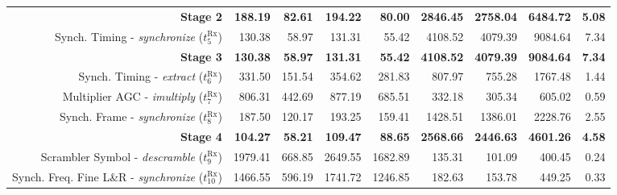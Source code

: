 \begin{table}[htp]
{{\begin{tabular}{r r r r r r r r r}
                                                                         \textbf{Stage 2} &  \textbf{188.19} &  \textbf{82.61} &  \textbf{194.22} &           \textbf{80.00} &  \textbf{2846.45} &  \textbf{2758.04} &  \textbf{6484.72} & \textbf{5.08}  \\ %
  \addlinespace
  \rowcolor{Paired-7!15}         Synch. Timing  - \emph{synchronize} ($t^\text{Rx}_{5}$)  &          130.38  &          58.97  &          131.31  &                   55.42  &          4108.52  &          4079.39  &          9084.64  &          7.34  \\
  \rowcolor{Paired-5!15}                                                 \textbf{Stage 3} &  \textbf{130.38} &  \textbf{58.97} &  \textbf{131.31} &           \textbf{55.42} &  \textbf{4108.52} &  \textbf{4079.39} &  \textbf{9084.64} &  \textbf{7.34} \\ %
  \addlinespace
  \rowcolor{Paired-7!15}          Synch. Timing -     \emph{extract} ($t^\text{Rx}_{6}$)  &          331.50  &         151.54  &          354.62  &                  281.83  &           807.97  &           755.28  &          1767.48  &          1.44  \\
                                 Multiplier AGC -   \emph{imultiply} ($t^\text{Rx}_{7}$)  &          806.31  &         442.69  &          877.19  &                  685.51  &           332.18  &           305.34  &           605.02  &          0.59  \\
  \rowcolor{Paired-7!15}           Synch. Frame - \emph{synchronize} ($t^\text{Rx}_{8}$)  &          187.50  &         120.17  &          193.25  &                  159.41  &          1428.51  &          1386.01  &          2228.76  &          2.55  \\
                                                                         \textbf{Stage 4} &  \textbf{104.27} &  \textbf{58.21} &  \textbf{109.47} &           \textbf{88.65} &  \textbf{2568.66} &  \textbf{2446.63} &  \textbf{4601.26} &  \textbf{4.58} \\ %
  \addlinespace
                               Scrambler Symbol -  \emph{descramble} ($t^\text{Rx}_{9}$)  &         1979.41  &         668.85  &         2649.55  &                  1682.89 &           135.31  &           101.09  &           400.45  &          0.24  \\
  \rowcolor{Paired-7!15} Synch. Freq. Fine L\&R - \emph{synchronize} ($t^\text{Rx}_{10}$) &         1466.55  &         596.19  &         1741.72  &                  1246.85 &           182.63  &           153.78  &           449.25  &          0.33  \\

\end{tabular}}}
\end{table}
